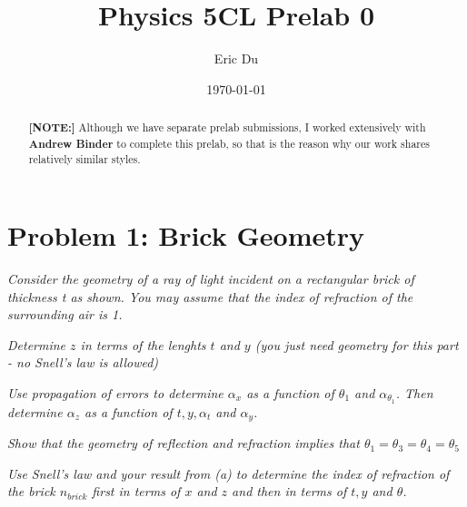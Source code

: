 \documentclass{article}
\title{Physics 5CL Prelab 0}
\author{Eric Du}
\date{\today}
\theoremstyle{definition}
\numberwithin{equation}{section}
\numberwithin{definition}{section}
\begin{document}
 
\begin{abstract}
    \textbf{[NOTE:]} Although we have separate prelab submissions, I worked extensively with \textbf{Andrew Binder} to complete this prelab, so that is the reason why our work shares relatively similar styles.
\end{abstract}
\section{Problem 1: Brick Geometry}

\textit{Consider the geometry of a ray of light incident on a rectangular brick of thickness t as shown. You may assume that the index of refraction of the surrounding air is 1.}
\begin{parts}
\Part \textit{Determine $z$ in terms of the lenghts $t$ and $y$ (you just need geometry for this part - no Snell's law is allowed)}

\Part \textit{Use propagation of errors to determine $\alpha_x$ as a function of $\theta_1$ and $\alpha_\theta_1$. Then determine $\alpha_z$ as a function of $t, y,\alpha_t$ and $\alpha_y$.} 

\Part \textit{Show that the geometry of reflection and refraction implies that $\theta_1 = \theta_3 = \theta_4 = \theta_5$}

\Part \textit{Use Snell's law and your result from (a) to determine the index of refraction of the brick $n_{brick}$ first in terms of $x$ and $z$ and then in terms of $t, y$ and $\theta$.}
\end{parts}
\end{document}
